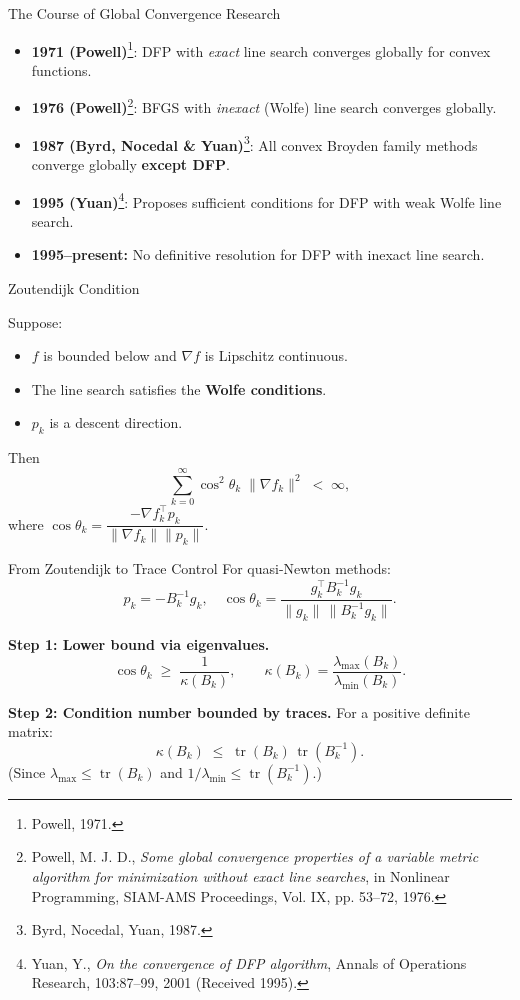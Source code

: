 \documentclass[aspectratio=169]{beamer}
\begin{document}
	\begin{frame}{The Course of Global Convergence Research}
		\begin{itemize}
			\item \textbf{1971 (Powell)}\footnote{Powell, 1971.}: DFP with \emph{exact} line search converges globally for convex functions.
			\item \textbf{1976 (Powell)}\footnote{Powell, M. J. D., \emph{Some global convergence properties of a variable metric algorithm for minimization without exact line searches}, in Nonlinear Programming, SIAM-AMS Proceedings, Vol. IX, pp. 53–72, 1976.}: BFGS with \emph{inexact} (Wolfe) line search converges globally.
			\item \textbf{1987 (Byrd, Nocedal \& Yuan)}\footnote{Byrd, Nocedal, Yuan, 1987.}: All convex Broyden family methods converge globally \textbf{except DFP}.
			\item \textbf{1995 (Yuan)}\footnote{Yuan, Y., \emph{On the convergence of DFP algorithm}, Annals of Operations Research, 103:87–99, 2001 (Received 1995).}: Proposes sufficient conditions for DFP with weak Wolfe line search.
			\item \textbf{1995--present:} No definitive resolution for DFP with inexact line search.
		\end{itemize}
	\end{frame}
	
	\begin{frame}{Zoutendijk Condition}
		\begin{theorem}[Zoutendijk, 1970]\footnotemark
			Suppose:
			\begin{itemize}
				\item \(f\) is bounded below and \(\nabla f\) is Lipschitz continuous.
				\item The line search satisfies the \textbf{Wolfe conditions}.
				\item \(p_k\) is a descent direction.
			\end{itemize}
			Then
			\[
			\sum_{k=0}^{\infty} \cos^2\theta_k \;\|\nabla f_k\|^2 \;<\; \infty,
			\]
			where \(\cos\theta_k = \dfrac{-\nabla f_k^\top p_k}{\|\nabla f_k\|\|p_k\|}\).
		\end{theorem}
	\end{frame}
	
	\begin{frame}{From Zoutendijk to Trace Control}
		For quasi-Newton methods:
		\[
		p_k = -B_k^{-1}g_k,\quad \cos\theta_k = \frac{g_k^\top B_k^{-1}g_k}{\|g_k\|\,\|B_k^{-1}g_k\|}.
		\]
		
		\textbf{Step 1: Lower bound via eigenvalues.}  
		\[
		\cos\theta_k \;\ge\; \frac{1}{\kappa(B_k)},\qquad 
		\kappa(B_k)=\frac{\lambda_{\max}(B_k)}{\lambda_{\min}(B_k)}.
		\]
		
		\textbf{Step 2: Condition number bounded by traces.}  
		For a positive definite matrix:
		\[
		\kappa(B_k) \;\le\; \operatorname{tr}(B_k)\,\operatorname{tr}(B_k^{-1}).
		\]
		(Since \(\lambda_{\max}\le\operatorname{tr}(B_k)\) and \(1/\lambda_{\min}\le\operatorname{tr}(B_k^{-1})\).)
	\end{frame}
	
\end{document}
